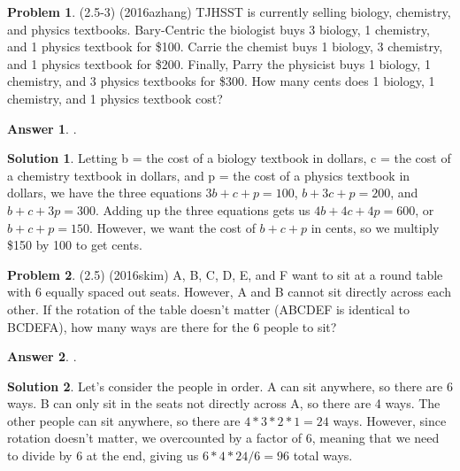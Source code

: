 \documentclass{article}
\theoremstyle{definition}
\newtheorem{problem}{Problem}
\newtheorem*{solution}{Solution}
\newtheorem*{answer}{Answer}
\begin{document}
\begin{problem}
(2.5-3) (2016azhang) TJHSST is currently selling biology, chemistry, and physics textbooks. Bary-Centric the biologist buys 3 biology, 1 chemistry, and 1 physics textbook for \$100. Carrie the chemist buys 1 biology, 3 chemistry, and 1 physics textbook for \$200. Finally, Parry the physicist buys 1 biology, 1 chemistry, and 3 physics textbooks for \$300. How many cents does 1 biology, 1 chemistry, and 1 physics textbook cost?
\end{problem}

\begin{answer}
.
\end{answer}

\begin{solution}
Letting b = the cost of a biology textbook in dollars, c = the cost of a chemistry textbook in dollars, and p = the cost of a physics textbook in dollars, we have the three equations $3b + c + p = 100$, $b + 3c + p = 200$, and $b + c + 3p = 300$. Adding up the three equations gets us $4b + 4c + 4p = 600$, or $b + c + p = 150$. However, we want the cost of $b + c + p$ in cents, so we multiply \$150 by 100 to get  cents.
\end{solution}

\begin{problem}
(2.5) (2016skim) A, B, C, D, E, and F want to sit at a round table with 6 equally spaced out seats. However, A and B cannot sit directly across each other. If the rotation of the table doesn't matter (ABCDEF is identical to BCDEFA), how many ways are there for the 6 people to sit?
\end{problem}

\begin{answer}
.
\end{answer}

\begin{solution}
Let's consider the people in order. A can sit anywhere, so there are 6 ways. B can only sit in the seats not directly across A, so there are 4 ways. The other people can sit anywhere, so there are $4*3*2*1 = 24$ ways. However, since rotation doesn't matter, we overcounted by a factor of $6$, meaning that we need to divide by $6$ at the end, giving us $6*4*24/6 = 96$ total ways.
\end{solution}
\end{document}
